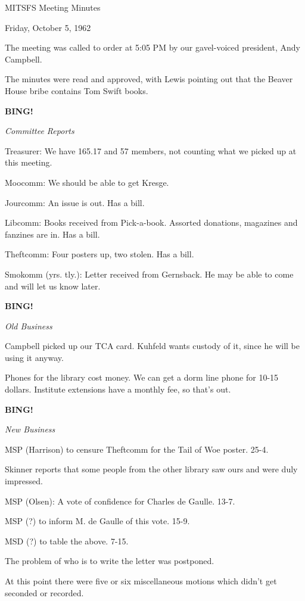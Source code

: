 \documentclass[12pt]{article}
\newcommand{\bing}{{\bf BING!} }
\newcommand{\goto}[1]{\bing \vskip 12pt \centerline{{\em{#1}}}}
\begin{document}
\begin{center}

MITSFS Meeting Minutes

Friday, October 5, 1962

\end{center}
 
\vspace{12pt}

\setlength{\parskip}{6pt}

\noindent
The meeting was called to order at 5:05 PM by our gavel-voiced president, Andy Campbell.

The minutes were read and approved, with Lewis pointing out that the Beaver House bribe contains Tom Swift books.

\goto{Committee Reports}

Treasurer: We have 165.17 and 57 members, not counting what we picked up at this meeting.

Moocomm: We should be able to get Kresge.

Jourcomm: An issue is out. Has a bill.

Libcomm: Books received from Pick-a-book. Assorted donations, magazines and fanzines are in. Has a bill.

Theftcomm: Four posters up, two stolen. Has a bill.

Smokomm (yrs. tly.): Letter received from Gernsback. He may be able to come and will let us know later.

\goto{Old Business}

Campbell picked up our TCA card. Kuhfeld wants custody of it, since he will be using it anyway.

Phones for the library cost money. We can get a dorm line phone for 10-15 dollars. Institute extensions have a monthly fee, so that's out.

\goto{New Business}

MSP (Harrison) to censure Theftcomm for the Tail of Woe poster. 25-4.

Skinner reports that some people from the other library saw ours and were duly impressed.

MSP (Olsen): A vote of confidence for Charles de Gaulle. 13-7.

MSP (?) to inform M. de Gaulle of this vote. 15-9.

MSD (?) to table the above. 7-15.

The problem of who is to write the letter was postponed.

At this point there were five or six miscellaneous motions which didn't get seconded or recorded.
\end{document}
